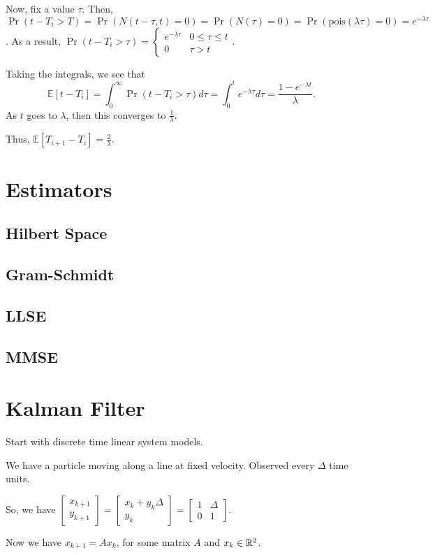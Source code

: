 \documentclass{article}
\newcommand{\EE}{\mathbb{E}}
\newcommand{\pois}{\mathrm{pois}}
\begin{document}
Now, fix a value $\tau$. Then, $\Pr(t - T_i > T) = \Pr(N(t-\tau, t) = 0) = \Pr(N(\tau) = 0) = \Pr(\pois(\lambda \tau) = 0) = e^{- \lambda \tau}$.
As a result, $\Pr(t - T_i > \tau) = \begin{cases} e^{-\lambda \tau} & 0 \leq \tau \leq t \\ 0 & \tau > t \end{cases}$.

Taking the integrals, we see that 
\[\EE[t - T_i] = \int_{0}^{\infty} \Pr(t - T_i > \tau) d \tau = \int_{0}^t e^{-\lambda \tau} d\tau = \frac{1 - e^{-\lambda t}}{\lambda}.\] 
As $t$ goes to $\lambda$, then this converges to $\frac{1}{\lambda}$. 

Thus, $\EE[T_{i+1} - T_i] = \boxed{\frac{2}{\lambda}}$.

\section{Estimators}
\subsection{Hilbert Space}
\subsection{Gram-Schmidt}
\subsection{LLSE}
\subsection{MMSE}

\section{Kalman Filter}
Start with discrete time linear system models.

\begin{example}
	We have a particle moving along a line at fixed velocity. Observed every $\Delta$ time units. 

	So, we have $\begin{bmatrix}x_{k+1} \\ y_{k+1}\end{bmatrix} = \begin{bmatrix} x_k + y_k \Delta \\ y_k \end{bmatrix} = \begin{bmatrix}1 & \Delta \\ 0 & 1 \end{bmatrix}$.

	Now we have $x_{k+1} = Ax_k$, for some matrix $A$ and $x_k \in \mathbb R^2$.
\end{example}
\end{document}
